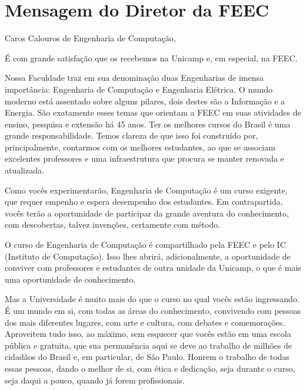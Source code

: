 
\section{Mensagem do Diretor da FEEC}

Caros Calouros de Engenharia de Computação,

É com grande satisfação que os recebemos na Unicamp e, em especial, na FEEC.

Nossa Faculdade traz em sua denominação duas Engenharias de imensa importância:
Engenharia de Computação e Engenharia Elétrica.  O mundo moderno está assentado
sobre alguns pilares, dois destes são a Informação e a Energia.  São exatamente
esses temas que orientam a FEEC em suas atividades de ensino, pesquisa e
extensão há 45 anos. Ter os melhores cursos do Brasil é uma grande
responsabilidade. Temos clareza de que isso foi construído por, principalmente,
contarmos com os melhores estudantes, ao que se associam excelentes professores
e uma infraestrutura que procura se manter renovada e atualizada.

Como vocês experimentarão, Engenharia de Computação é um curso exigente, que
requer empenho e espera desempenho dos estudantes. Em contrapartida, vocês terão
a oportunidade de participar da grande aventura do conhecimento, com
descobertas, talvez invenções, certamente com método.

O curso de Engenharia de Computação é compartilhado pela FEEC e pelo IC
(Instituto de Computação). Isso lhes abrirá, adicionalmente, a oportunidade de
conviver com professores e estudantes de outra unidade da Unicamp, o que é mais
uma oportunidade de conhecimento.

Mas a Universidade é muito mais do que o curso no qual vocês estão ingressando.
É um mundo em si, com todas as áreas do conhecimento, convivendo com pessoas dos
mais diferentes lugares, com arte e cultura, com debates e comemorações.
Aproveitem tudo isso, ao máximo, sem esquecer que vocês estão em uma escola
pública e gratuita, que sua permanência aqui se deve ao trabalho de milhões de
cidadãos do Brasil e, em particular, de São Paulo. Honrem o trabalho de todas
essas pessoas, dando o melhor de si, com ética e dedicação, seja durante o
curso, seja daqui a pouco, quando já forem profissionais.

